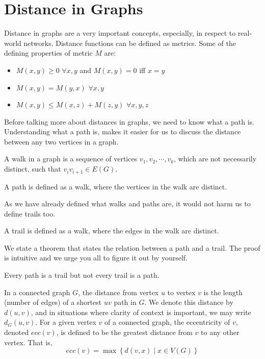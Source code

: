 \documentclass[../basic_graph_theory.tex]{subfiles}
\begin{document}
\chapter{Distance in Graphs}
\setcounter{chapter}{2} %
\setcounter{section}{2}
\setcounter{equation}{2}
\setcounter{figure}{2}

Distance in graphs are a very important concepts, especially, in respect to real-world networks. Distance functions can be defined as metrics. Some of the defining properties of metric $M$ are:
\begin{itemize}
    \item $M(x,y) \ge 0$ $\forall x,y$ and $M(x,y)=0$ iff $x=y$
    \item $M(x,y)=M(y,x)$ $\forall x,y$
    \item $M(x,y) \le M(x,z)+M(z,y)$ $\forall x,y,z$
\end{itemize}

Before talking more about distances in graphs, we need to know what a path is. Understanding what a path is, makes it easier for us to discuss the distance between any two vertices in a graph.

\begin{defn}
    A walk in a graph is a sequence of vertices $v_1, v_2,\cdots, v_k$, which are not necessarily distinct, such that $v_iv_{i+1} \in E(G)$.
\end{defn}

\begin{defn}
    A path is defined as a walk, where the vertices in the walk are distinct.
\end{defn}

As we have already defined what walks and paths are, it would not harm us to define trails too.

\begin{defn}
    A trail is defined as a walk, where the edges in the walk are distinct.
\end{defn}

We state a theorem that states the relation between a path and a trail. The proof is intuitive and we urge you all to figure it out by yourself.

\begin{thm}
    Every path is a trail but not every trail is a path.
\end{thm}

In a connected graph $G$, the distance from vertex $u$ to vertex $v$ is the length (number of edges) of a shortest $uv$ path in $G$. We denote this distance by $d(u,v)$, and in situations where clarity of context is important, we may write $d_G(u,v)$.
For a given vertex $v$ of a connected graph, the eccentricity of $v$, denoted $ecc(v)$, is defined to be the greatest distance from $v$ to any other vertex. That is,\\
\[
    ecc(v) = \max \left\{ d(v,x) \mid x \in V(G) \right\}
\]
\end{document}
